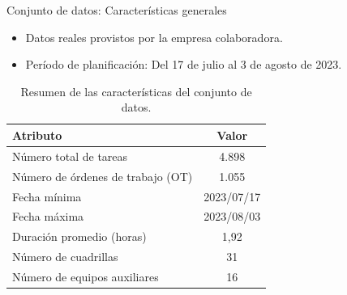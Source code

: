 \documentclass[pdfpagelabels=false, usepdftitle=false, aspectratio=169]{beamer}
\begin{document}
\begin{frame}{Conjunto de datos: Características generales}
\begin{itemize}
    \item Datos reales provistos por la empresa colaboradora.
    \item Período de planificación: Del 17 de julio al 3 de agosto de 2023.
    \vfill
\end{itemize}

\scriptsize
\begin{table}[htbp]
    \centering
    \begin{tabular}{lc}
        \toprule
        \textbf{Atributo} & \textbf{Valor} \\
        \midrule
        Número total de tareas & 4.898 \\
        Número de órdenes de trabajo (OT) & 1.055 \\
        Fecha mínima & 2023/07/17 \\
        Fecha máxima & 2023/08/03 \\
        Duración promedio (horas) & 1,92 \\
        Número de cuadrillas & 31 \\
        Número de equipos auxiliares & 16 \\
        \bottomrule
    \end{tabular}
    \caption{Resumen de las características del conjunto de datos.}
    \label{tab:dataset_summary}
\end{table}
\vfill
\end{frame}
\end{document}
